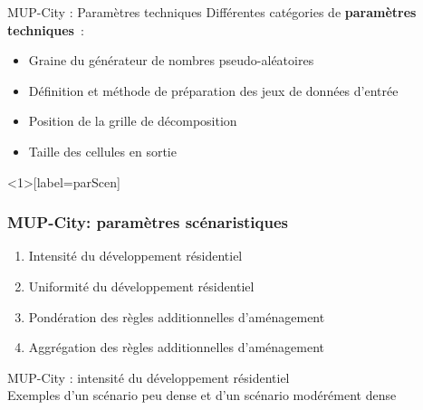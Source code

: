 \documentclass[xcolor=table]{beamer}
\begin{document}
\begin{frame}{MUP-City : Paramètres techniques}
Différentes catégories de \textbf{paramètres techniques}~:\\
\begin{itemize}
	\item Graine du générateur de nombres pseudo-aléatoires
	\item Définition et méthode de préparation des jeux de données d'entrée
	\item Position de la grille de décomposition
	\item Taille des cellules en sortie
\end{itemize}
\end{frame}

\begin{frame}<1>[label=parScen]
\frametitle{MUP-City: paramètres scénaristiques}
	\begin{enumerate}
		\item \alert<1>{Intensité du développement résidentiel}
		\item<2-> \alert<2>{Uniformité du développement résidentiel}
		\item<3-> \alert<3>{Pondération des règles additionnelles d'aménagement}
		\item<4> \alert<4>{Aggrégation des règles additionnelles d'aménagement}
	\end{enumerate}
\end{frame}

\begin{frame}{MUP-City : intensité du développement résidentiel}
\vspace{1cm}
\\
{\footnotesize Exemples d'un scénario peu dense et d'un scénario modérément dense}
\end{frame}
\end{document}
